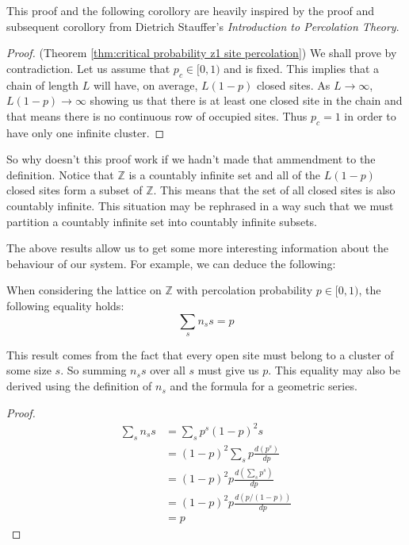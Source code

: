 This proof and the following corollory are heavily inspired by the proof and subsequent corollory from Dietrich Stauffer's \textit{Introduction to Percolation Theory}. \cite{Stauffer}

\begin{proof}{(Theorem \ref{thm:critical probability z1 site percolation})}
  We shall prove by contradiction. Let us assume that $p_c \in [0, 1)$ and is fixed. This implies that a chain of length $L$ will have, on average, $L(1-p)$ closed sites. As $L
  \rightarrow \infty$, $L(1-p) \rightarrow \infty$ showing us that there is at least one closed site in the chain and that means there is no continuous row of occupied
  sites. Thus $p_c=1$ in order to have only one infinite cluster.
\end{proof}

So why doesn't this proof work if we hadn't made that ammendment to the definition. Notice that $\mathbb{Z}$ is a countably infinite set and all of the $L(1-p)$ closed sites form a
subset of $\mathbb{Z}$. This means that the set of all closed sites is also countably infinite. This situation may be rephrased in a way such that we must partition a countably infinite set into
countably infinite subsets. 

The above results allow us to get some more interesting information about the behaviour of our system. For example, we can deduce the following:
\begin{corollary}
  When considering the lattice on $\mathbb{Z}$ with percolation probability $p \in [0, 1)$, the following equality holds:
  $$\sum_sn_ss = p$$
\end{corollary}
This result comes from the fact that every open site must belong to a cluster of some size $s$. So summing $n_ss$ over all $s$ must give us $p$. This equality may also be derived
using the definition of $n_s$ and the formula for a geometric series.

\begin{proof}
  \begin{align*}
    \sum_sn_ss &= \sum_sp^s(1-p)^2s \\
    &= (1-p)^2\sum_sp\frac{d(p^s)}{dp} \\
    &= (1-p)^2p\frac{d(\sum_sp^s)}{dp} \\
    &= (1-p)^2p\frac{d(p/(1-p))}{dp} \\
    &= p
  \end{align*}
\end{proof}

